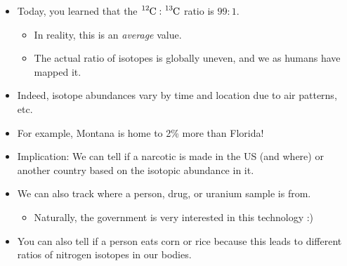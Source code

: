 \documentclass[../notes.tex]{subfiles}
\begin{document}
\begin{itemize}
\begin{itemize}
        \item Today, you learned that the $\ce{{}^12C}:\ce{{}^13C}$ ratio is $99:1$.
        \begin{itemize}
            \item In reality, this is an \emph{average} value.
            \item The actual ratio of isotopes is globally uneven, and we as humans have mapped it.
        \end{itemize}
        \item Indeed, isotope abundances vary by time and location due to air patterns, etc.
        \item For example, Montana is home to 2\% more  than Florida!
        \item Implication: We can tell if a narcotic is made in the US (and where) or another country based on the isotopic abundance in it.
        \item We can also track where a person, drug, or uranium sample is from.
        \begin{itemize}
            \item Naturally, the government is very interested in this technology :)
        \end{itemize}
        \item You can also tell if a person eats corn or rice because this leads to different ratios of nitrogen isotopes in our bodies.
    \end{itemize}
\end{itemize}
\end{document}
